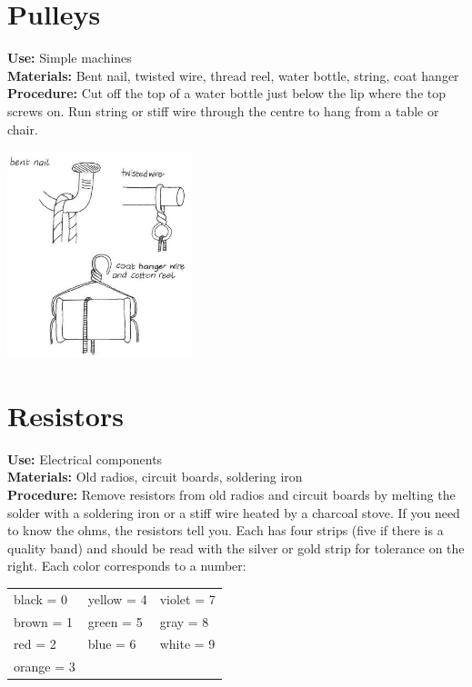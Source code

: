 \begin{multicols}{2}
\section{Pulleys} 
\label{sec:pulleys}
\vspace{-10pt}
\textbf{Use:} Simple machines\\
\textbf{Materials:} Bent nail, twisted wire, thread reel, water bottle, string, coat hanger\\
\textbf{Procedure:} Cut off the top of a water bottle just below the lip where the top screws on. Run string or stiff wire through the centre to hang from a table or chair.
\begin{center}
\includegraphics[width=0.4\textwidth]{./img/vso/pulleys.jpg}
\end{center}

\columnbreak

\section{Resistors} 
\label{sec:resistors}
\vspace{-10pt}
\textbf{Use:} Electrical components\\
\textbf{Materials:} Old radios, circuit boards, soldering iron\\
\textbf{Procedure:} Remove resistors from old radios and circuit boards by melting the solder with a soldering iron or a stiff wire heated by a charcoal stove. If you need to know the ohms, the resistors tell you. Each has four strips (five if there is a quality band) and should be read with the silver or gold strip for tolerance on the right. Each color corresponds to a number:\\[10pt]

\begin{tabular}{lll}
black = 0 & yellow = 4 & violet = 7\\
brown = 1 & green = 5 & gray = 8\\
red = 2 & blue = 6 & white = 9\\
orange = 3 & & \\[10pt]
\end{tabular} 


\end{multicols}
